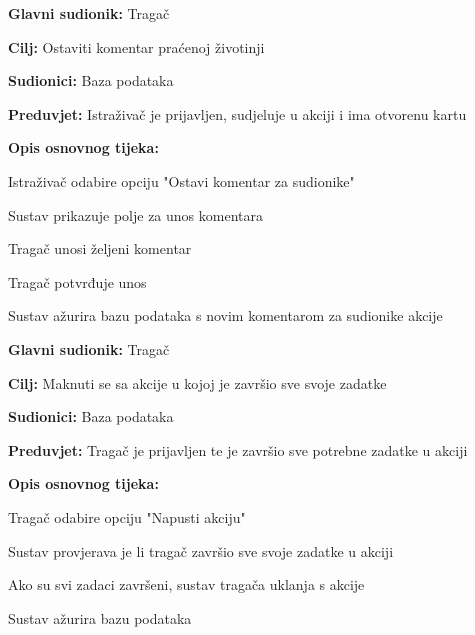 					\noindent {}
					\begin{packed_item}
						
						\item \textbf{Glavni sudionik: }Tragač
						\item  \textbf{Cilj:} Ostaviti komentar praćenoj životinji 
						\item  \textbf{Sudionici:} Baza podataka
						\item  \textbf{Preduvjet:} Istraživač je prijavljen, sudjeluje u akciji i ima otvorenu kartu
						\item  \textbf{Opis osnovnog tijeka:}
						
						\item[] \begin{packed_enum}
							
							\item Istraživač odabire opciju "Ostavi komentar za sudionike" 
							\item Sustav prikazuje polje za unos komentara 
							\item Tragač unosi željeni komentar 
							\item Tragač potvrđuje unos 
							\item Sustav ažurira bazu podataka s novim komentarom za sudionike akcije 
						\end{packed_enum}
					\end{packed_item}
					
					\noindent \underbar{\textbf{UC12 -Micanje s akcije}}
					\begin{packed_item}
						
						\item \textbf{Glavni sudionik: }Tragač
						\item  \textbf{Cilj:} Maknuti se sa akcije u kojoj je završio sve svoje zadatke 
						\item  \textbf{Sudionici:} Baza podataka
						\item  \textbf{Preduvjet:} Tragač je prijavljen te je završio sve potrebne zadatke u akciji 
						\item  \textbf{Opis osnovnog tijeka:}
						
						\item[] \begin{packed_enum}
							
							\item Tragač odabire opciju "Napusti akciju" 
							\item Sustav provjerava je li tragač završio sve svoje zadatke u akciji 
							\item Ako su svi zadaci završeni, sustav tragača uklanja s akcije 
							\item Sustav ažurira bazu podataka 
						\end{packed_enum}
					\end{packed_item}
					

